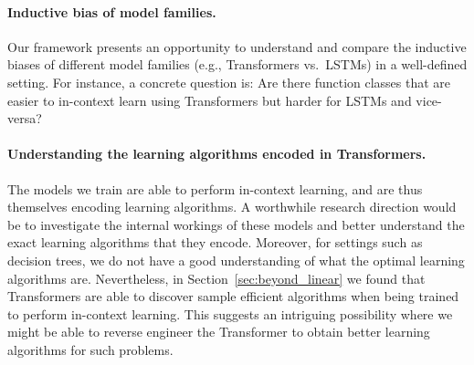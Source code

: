 \paragraph{Inductive bias of model families.} Our framework presents an opportunity to understand and compare the inductive biases of different model families (e.g., Transformers vs.\ LSTMs) in a well-defined setting. For instance, a concrete question is: Are there function classes that are easier to in-context learn using Transformers but harder for LSTMs and vice-versa?

\paragraph{Understanding the learning algorithms encoded in Transformers.}
The models we train are able to perform in-context learning, and are thus themselves encoding learning algorithms. A worthwhile research
direction would be to investigate the internal workings of these models and better understand the exact
learning algorithms that they encode.
Moreover, for settings such as decision trees, we do not have a good understanding of what the optimal learning algorithms are.
Nevertheless, in Section~\ref{sec:beyond_linear} we found that Transformers are able to discover sample efficient algorithms when being trained to perform in-context learning.
This suggests an intriguing possibility where we might be able to reverse engineer the Transformer to obtain better learning algorithms for such problems.